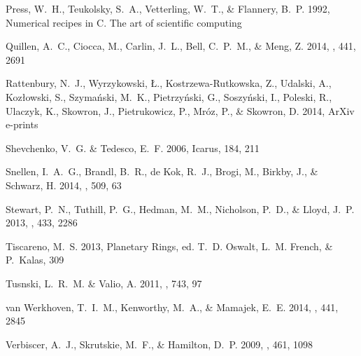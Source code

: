 \documentclass{emulateapj}
\newcommand{\icarus}{Icarus}
\begin{document}
\begin{thebibliography}{45}
{Press}, W.~H., {Teukolsky}, S.~A., {Vetterling}, W.~T., \& {Flannery}, B.~P.
  1992, {Numerical recipes in C. The art of scientific computing}

{Quillen}, A.~C., {Ciocca}, M., {Carlin}, J.~L., {Bell}, C.~P.~M., \& {Meng},
  Z. 2014, \mnras, 441, 2691

{Rattenbury}, N.~J., {Wyrzykowski}, {\L}., {Kostrzewa-Rutkowska}, Z.,
  {Udalski}, A., {Koz{\l}owski}, S., {Szyma{\'n}ski}, M.~K., {Pietrzy{\'n}ski},
  G., {Soszy{\'n}ski}, I., {Poleski}, R., {Ulaczyk}, K., {Skowron}, J.,
  {Pietrukowicz}, P., {Mr{\'o}z}, P., \& {Skowron}, D. 2014, ArXiv e-prints

{Shevchenko}, V.~G. \& {Tedesco}, E.~F. 2006, \icarus, 184, 211

{Snellen}, I.~A.~G., {Brandl}, B.~R., {de Kok}, R.~J., {Brogi}, M., {Birkby},
  J., \& {Schwarz}, H. 2014, \nat, 509, 63

{Stewart}, P.~N., {Tuthill}, P.~G., {Hedman}, M.~M., {Nicholson}, P.~D., \&
  {Lloyd}, J.~P. 2013, \mnras, 433, 2286

{Tiscareno}, M.~S. 2013, {Planetary Rings}, ed. T.~D. {Oswalt}, L.~M. {French},
  \& P.~{Kalas}, 309

{Tusnski}, L.~R.~M. \& {Valio}, A. 2011, \apj, 743, 97

{van Werkhoven}, T.~I.~M., {Kenworthy}, M.~A., \& {Mamajek}, E.~E. 2014,
  \mnras, 441, 2845

{Verbiscer}, A.~J., {Skrutskie}, M.~F., \& {Hamilton}, D.~P. 2009, \nat, 461,
  1098


\end{thebibliography}
\end{document}
